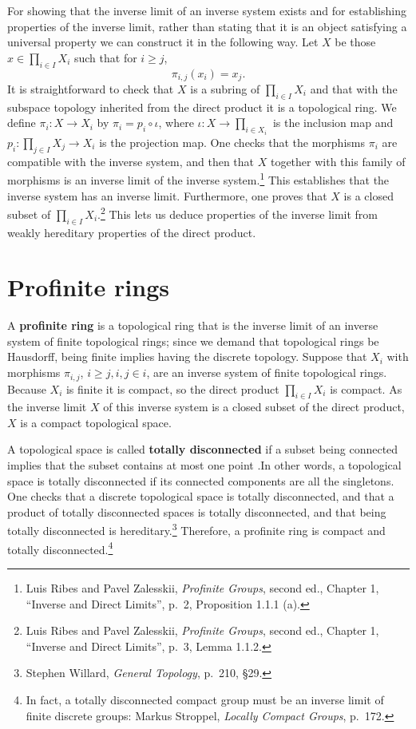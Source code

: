 \documentclass{article}
\theoremstyle{definition}
\begin{document}
For showing that the inverse limit of an inverse system exists and for establishing properties of the inverse
limit, rather than stating that it is an object satisfying a universal property we can construct it in the following
way. Let $X$ be those $x \in \prod_{i \in I} X_i$ such that for $i \geq j$,
\[
\pi_{i,j}(x_i) = x_j.
\]
It is straightforward to check that $X$ is a subring of $\prod_{i \in I} X_i$ and that with the subspace topology inherited from the direct product
it is a topological ring.
We define $\pi_i:X \to X_i$ by $\pi_i = p_i \circ \iota$, where 
$\iota:X \to \prod_{i \in X_i}$ is the inclusion map and
$p_i: \prod_{j \in I} X_j \to X_i$ is the projection map. One checks that the morphisms $\pi_i$ are compatible with the inverse system, and then that 
$X$ together with this family of morphisms is an inverse limit of the inverse system.\footnote{Luis Ribes and Pavel Zalesskii, {\em Profinite Groups}, second ed., Chapter 1, ``Inverse and Direct Limits'', p.~2, Proposition 1.1.1 (a).}
This establishes that the inverse system has an inverse limit. Furthermore, 
one proves that $X$ is a closed subset of $\prod_{i \in I} X_i$.\footnote{Luis Ribes and Pavel Zalesskii, {\em Profinite Groups}, second ed., Chapter 1, ``Inverse and Direct Limits'', p.~3, Lemma 1.1.2.}
This lets us deduce properties of the inverse limit from  weakly hereditary properties of the direct product.



\section{Profinite rings}
A \textbf{profinite ring} is a topological ring that is the inverse limit of an inverse system of finite topological rings; since we demand that
topological rings be Hausdorff, being finite implies having the discrete topology. Suppose that
$X_i$ with morphisms $\pi_{i,j}$, $i \geq j, i,j \in i$, are an inverse system of finite topological rings.
Because $X_i$ is finite it is compact, so the direct product $\prod_{i \in I} X_i$ is compact. As the inverse limit $X$ of this inverse system is a closed
subset of the direct product, $X$ is a compact topological space.

A topological space is called \textbf{totally disconnected} if a subset being connected implies that the subset contains at most one point .In other
words, a topological space is totally disconnected if its connected components are all the singletons. 
One checks that a discrete topological space is totally disconnected, and that a product of totally disconnected spaces is totally
disconnected, and that being totally disconnected is hereditary.\footnote{Stephen Willard, {\em General Topology}, p.~210, \S 29.}
Therefore, a profinite ring is compact and totally disconnected.\footnote{In fact, a totally disconnected compact group
must be an inverse limit of finite discrete groups: Markus Stroppel, {\em Locally Compact Groups}, p.~172.}
\end{document}
